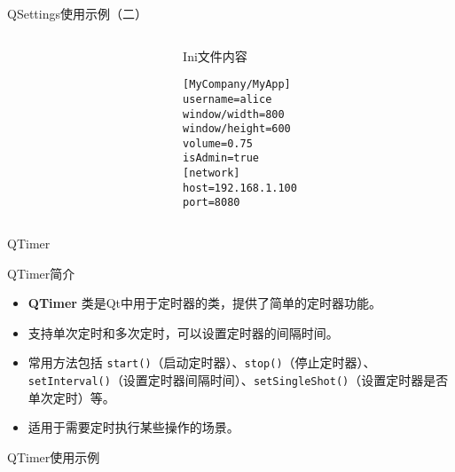 \documentclass[UTF8,aspectratio=169]{beamer}
\begin{document}
\begin{frame}[fragile]{QSettings使用示例（二）}
    \begin{columns}
        \begin{column}{0.48\textwidth}
            \inputminted[firstline=33,lastline=53]{cpp}{code/qt_settings_example.cpp}
        \end{column}
        \begin{column}{0.48\textwidth}
            \begin{ytublock}{Ini文件内容}
                \begin{verbatim}
[MyCompany/MyApp]
username=alice
window/width=800
window/height=600
volume=0.75
isAdmin=true
[network]
host=192.168.1.100
port=8080
                \end{verbatim}
            \end{ytublock}
        \end{column}
    \end{columns}
\end{frame}

\begin{frame}{QTimer}
    \begin{ytublock}{QTimer简介}
        \begin{itemize}
            \item \textbf{QTimer} 类是Qt中用于定时器的类，提供了简单的定时器功能。
            \item 支持单次定时和多次定时，可以设置定时器的间隔时间。
            \item 常用方法包括 \texttt{start()}（启动定时器）、\texttt{stop()}（停止定时器）、\texttt{setInterval()}（设置定时器间隔时间）、\texttt{setSingleShot()}（设置定时器是否单次定时）等。
            \item 适用于需要定时执行某些操作的场景。
        \end{itemize}
    \end{ytublock}
\end{frame}

\begin{frame}[fragile]{QTimer使用示例}
    \begin{columns}
        \begin{column}{0.48\textwidth}
            \inputminted[firstline=1,lastline=15]{cpp}{code/qt_timer_example.cpp}
        \end{column}
        \begin{column}{0.48\textwidth}
            \inputminted[firstline=17,lastline=34]{cpp}{code/qt_timer_example.cpp}
        \end{column}
    \end{columns}
\end{frame}
\end{document}
